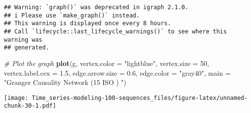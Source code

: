 \documentclass[
]{article}
\newenvironment{Shaded}{\begin{snugshade}}{\end{snugshade}}
\newcommand{\AttributeTok}[1]{\textcolor[rgb]{0.13,0.29,0.53}{#1}}
\newcommand{\CommentTok}[1]{\textcolor[rgb]{0.56,0.35,0.01}{\textit{#1}}}
\newcommand{\DecValTok}[1]{\textcolor[rgb]{0.00,0.00,0.81}{#1}}
\newcommand{\FloatTok}[1]{\textcolor[rgb]{0.00,0.00,0.81}{#1}}
\newcommand{\FunctionTok}[1]{\textcolor[rgb]{0.13,0.29,0.53}{\textbf{#1}}}
\newcommand{\NormalTok}[1]{#1}
\newcommand{\StringTok}[1]{\textcolor[rgb]{0.31,0.60,0.02}{#1}}
\begin{document}
\begin{verbatim}
## Warning: `graph()` was deprecated in igraph 2.1.0.
## i Please use `make_graph()` instead.
## This warning is displayed once every 8 hours.
## Call `lifecycle::last_lifecycle_warnings()` to see where this warning was
## generated.
\end{verbatim}

\begin{Shaded}
\begin{Highlighting}[]
\CommentTok{\# Plot the graph}
\FunctionTok{plot}\NormalTok{(g,}
     \AttributeTok{vertex.color =} \StringTok{"lightblue"}\NormalTok{,}
     \AttributeTok{vertex.size =} \DecValTok{50}\NormalTok{,}
     \AttributeTok{vertex.label.cex =} \FloatTok{1.5}\NormalTok{,}
     \AttributeTok{edge.arrow.size =} \FloatTok{0.6}\NormalTok{,}
     \AttributeTok{edge.color =} \StringTok{"gray40"}\NormalTok{,}
     \AttributeTok{main =} \StringTok{"Granger Causality Network (15 ISO ) "}\NormalTok{)}
\end{Highlighting}
\end{Shaded}

\texttt{[image: Time\_series-modeling-100-sequences\_files/figure-latex/unnamed-chunk-30-1.pdf]}
\end{document}
